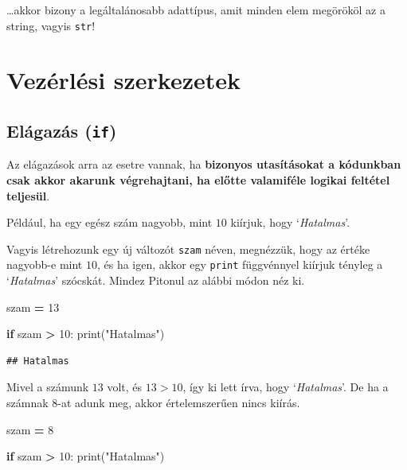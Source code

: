 \documentclass[
]{book}
\newenvironment{Shaded}{\begin{snugshade}}{\end{snugshade}}
\newcommand{\BuiltInTok}[1]{#1}
\newcommand{\ControlFlowTok}[1]{\textcolor[rgb]{0.13,0.29,0.53}{\textbf{#1}}}
\newcommand{\DecValTok}[1]{\textcolor[rgb]{0.00,0.00,0.81}{#1}}
\newcommand{\NormalTok}[1]{#1}
\newcommand{\OperatorTok}[1]{\textcolor[rgb]{0.81,0.36,0.00}{\textbf{#1}}}
\newcommand{\StringTok}[1]{\textcolor[rgb]{0.31,0.60,0.02}{#1}}
\begin{document}
\ldots akkor bizony a legáltalánosabb adattípus, amit minden elem megörököl az a string, vagyis \texttt{str}!

\section{Vezérlési szerkezetek}\label{vezuxe9rluxe9si-szerkezetek}

\subsection{\texorpdfstring{Elágazás (\texttt{if})}{Elágazás (if)}}\label{eluxe1gazuxe1s-if}

Az elágazások arra az esetre vannak, ha \textbf{bizonyos utasításokat a kódunkban csak akkor akarunk végrehajtani, ha előtte valamiféle logikai feltétel teljesül}.

Például, ha egy egész szám nagyobb, mint \(10\) kiírjuk, hogy `\emph{Hatalmas}'.

Vagyis létrehozunk egy új változót \texttt{szam} néven, megnézzük, hogy az értéke nagyobb-e mint \(10\), és ha igen, akkor egy \texttt{print} függvénnyel kiírjuk tényleg a `\emph{Hatalmas}' szócskát.
Mindez Pitonul az alábbi módon néz ki.

\begin{Shaded}
\begin{Highlighting}[]
\NormalTok{szam }\OperatorTok{=} \DecValTok{13}

\ControlFlowTok{if}\NormalTok{ szam }\OperatorTok{\textgreater{}} \DecValTok{10}\NormalTok{:}
  \BuiltInTok{print}\NormalTok{(}\StringTok{"Hatalmas"}\NormalTok{)}
\end{Highlighting}
\end{Shaded}

\begin{verbatim}
## Hatalmas
\end{verbatim}

Mivel a számunk \(13\) volt, és \(13>10\), így ki lett írva, hogy `\emph{Hatalmas}'. De ha a számnak \(8\)-at adunk meg, akkor értelemszerűen nincs kiírás.

\begin{Shaded}
\begin{Highlighting}[]
\NormalTok{szam }\OperatorTok{=} \DecValTok{8}

\ControlFlowTok{if}\NormalTok{ szam }\OperatorTok{\textgreater{}} \DecValTok{10}\NormalTok{:}
  \BuiltInTok{print}\NormalTok{(}\StringTok{"Hatalmas"}\NormalTok{)}
\end{Highlighting}
\end{Shaded}
\end{document}
